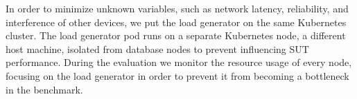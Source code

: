 In order to minimize unknown variables, such as network latency, reliability, and interference of other devices, we put the load generator on the same Kubernetes cluster.
The load generator pod runs on a separate Kubernetes node, a different host machine, isolated from database nodes to prevent influencing SUT performance.
During the evaluation we monitor the resource usage of every node, focusing on the load generator in order to prevent it from becoming a bottleneck in the benchmark.
